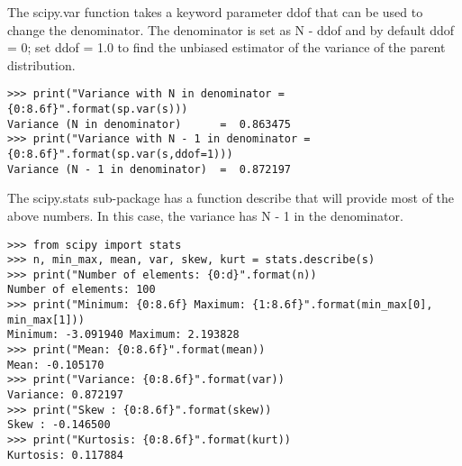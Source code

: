 The scipy.var function takes a keyword parameter ddof that can be used to change the denominator. The denominator is set as N - ddof and by default ddof = 0; set ddof = 1.0 to find the unbiased estimator of the variance of the parent distribution.
\begin{framed}
\begin{verbatim}
>>> print("Variance with N in denominator = {0:8.6f}".format(sp.var(s)))
Variance (N in denominator)      =  0.863475
>>> print("Variance with N - 1 in denominator = {0:8.6f}".format(sp.var(s,ddof=1)))
Variance (N - 1 in denominator)  =  0.872197
\end{verbatim}
\end{framed}
The scipy.stats sub-package has a function describe that will provide most of the above numbers. In this case, the variance has N - 1 in the denominator.

\begin{framed}
\begin{verbatim}
>>> from scipy import stats
>>> n, min_max, mean, var, skew, kurt = stats.describe(s)
>>> print("Number of elements: {0:d}".format(n))
Number of elements: 100
>>> print("Minimum: {0:8.6f} Maximum: {1:8.6f}".format(min_max[0], min_max[1]))
Minimum: -3.091940 Maximum: 2.193828
>>> print("Mean: {0:8.6f}".format(mean))
Mean: -0.105170
>>> print("Variance: {0:8.6f}".format(var))
Variance: 0.872197
>>> print("Skew : {0:8.6f}".format(skew))
Skew : -0.146500
>>> print("Kurtosis: {0:8.6f}".format(kurt))
Kurtosis: 0.117884
\end{verbatim}
\end{framed}

